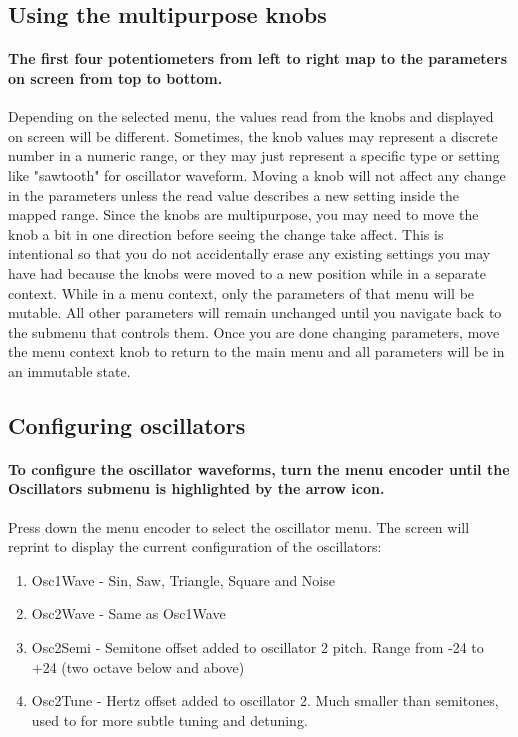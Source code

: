 \documentclass[acmlarge,screen]{acmart}
\begin{document}
\subsection{Using the multipurpose knobs}
\paragraph{The first four potentiometers from left to right map to the parameters on screen from top to bottom.} Depending on the selected menu, the values read from the knobs and displayed on screen will be different. Sometimes, the knob values may represent a discrete number in a numeric range, or they may just represent a specific type or setting like "sawtooth" for oscillator waveform. Moving a knob will not affect any change in the parameters unless the read value describes a new setting inside the mapped range. Since the knobs are multipurpose, you may need to move the knob a bit in one direction before seeing the change take affect. This is intentional so that you do not accidentally erase any existing settings you may have had because the knobs were moved to a new position while in a separate context. While in a menu context, only the parameters of that menu will be mutable. All other parameters will remain unchanged until you navigate back to the submenu that controls them. Once you are done changing parameters, move the menu context knob to return to the main menu and all parameters will be in an immutable state.

\subsection{Configuring oscillators}
\paragraph{To configure the oscillator waveforms, turn the menu encoder until the Oscillators submenu is highlighted by the arrow icon.} Press down the menu encoder to select the oscillator menu. The screen will reprint to display the current configuration of the oscillators:\\
	\begin{enumerate}
		\item Osc1Wave - Sin, Saw, Triangle, Square and Noise
		\item Osc2Wave - Same as Osc1Wave
		\item Osc2Semi - Semitone offset added to oscillator 2 pitch. Range from -24 to +24 (two octave below and above)
		\item Osc2Tune - Hertz offset added to oscillator 2. Much smaller than semitones, used to for more subtle tuning and detuning.
	\end{enumerate}
\end{document}
